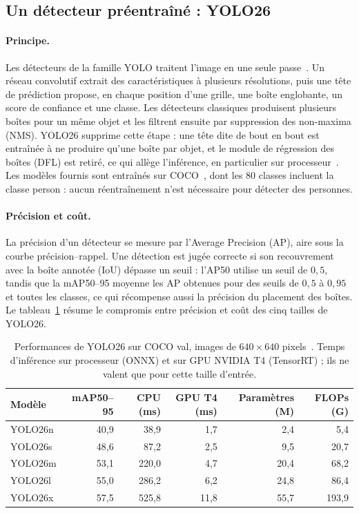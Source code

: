 \documentclass[11pt,a4paper]{article}
\renewcommand{\emph}[1]{\textup{#1}}
\begin{document}
\subsection{Un détecteur préentraîné : YOLO26}

\paragraph{Principe.} Les détecteurs de la famille YOLO traitent l'image en une seule passe~\cite{redmon2016yolo}. Un réseau convolutif extrait des caractéristiques à plusieurs résolutions, puis une tête de prédiction propose, en chaque position d'une grille, une boîte englobante, un score de confiance et une classe. Les détecteurs classiques produisent plusieurs boîtes pour un même objet et les filtrent ensuite par suppression des non-maxima (NMS). YOLO26 supprime cette étape : une tête dite \emph{de bout en bout} est entraînée à ne produire qu'une boîte par objet, et le module de régression des boîtes (DFL) est retiré, ce qui allège l'inférence, en particulier sur processeur~\cite{yolo26}. Les modèles fournis sont entraînés sur COCO~\cite{lin2014coco}, dont les 80 classes incluent la classe \emph{person} : aucun réentraînement n'est nécessaire pour détecter des personnes.

\paragraph{Précision et coût.} La précision d'un détecteur se mesure par l'\emph{Average Precision} (AP), aire sous la courbe précision--rappel. Une détection est jugée correcte si son recouvrement avec la boîte annotée (IoU) dépasse un seuil : l'AP50 utilise un seuil de $0{,}5$, tandis que la mAP50--95 moyenne les AP obtenues pour des seuils de $0{,}5$ à $0{,}95$ et toutes les classes, ce qui récompense aussi la précision du placement des boîtes. Le tableau~\ref{tab:yolo26} résume le compromis entre précision et coût des cinq tailles de YOLO26.

\begin{table}[H]
\centering\small
\begin{tabular}{lrrrrr}
\toprule
Modèle & mAP50--95 & CPU (ms) & GPU T4 (ms) & Paramètres (M) & FLOPs (G)\\
\midrule
YOLO26n & 40,9 & 38,9 & 1,7 & 2,4 & 5,4\\
YOLO26s & 48,6 & 87,2 & 2,5 & 9,5 & 20,7\\
YOLO26m & 53,1 & 220,0 & 4,7 & 20,4 & 68,2\\
YOLO26l & 55,0 & 286,2 & 6,2 & 24,8 & 86,4\\
YOLO26x & 57,5 & 525,8 & 11,8 & 55,7 & 193,9\\
\bottomrule
\end{tabular}
\caption{Performances de YOLO26 sur COCO val, images de $640\times640$ pixels~\cite{yolo26}. Temps d'inférence sur processeur (ONNX) et sur GPU NVIDIA T4 (TensorRT) ; ils ne valent que pour cette taille d'entrée.}
\label{tab:yolo26}
\end{table}
\end{document}
